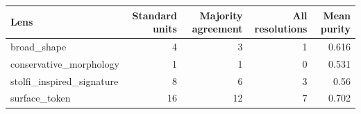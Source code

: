 {\small
\begin{tabular}{lrrrr}
\toprule
Lens & Standard units & Majority agreement & All resolutions & Mean purity \\
\midrule
broad\_shape & 4 & 3 & 1 & 0.616 \\
conservative\_morphology & 1 & 1 & 0 & 0.531 \\
stolfi\_inspired\_signature & 8 & 6 & 3 & 0.56 \\
surface\_token & 16 & 12 & 7 & 0.702 \\
\bottomrule
\end{tabular}
}

